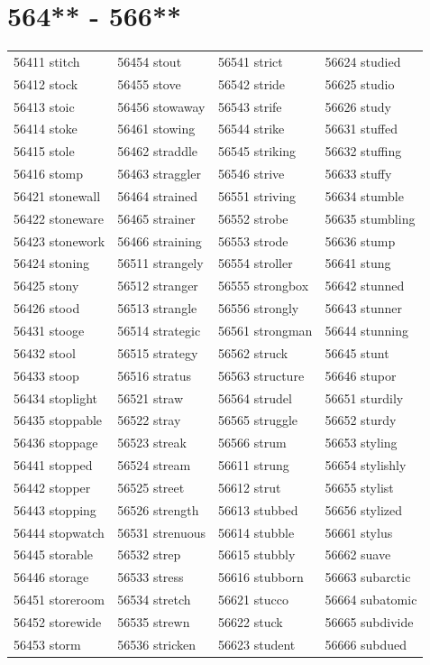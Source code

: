 \documentclass[10pt, oneside]{book}
\begin{document}
\begin{table}
	\centering
	\section*{564** - 566**}
	\begin{tabular}{l l l l}
56411 stitch &56454 stout &56541 strict &56624 studied\\
56412 stock &56455 stove &56542 stride &56625 studio\\
56413 stoic &56456 stowaway &56543 strife &56626 study\\
56414 stoke &56461 stowing &56544 strike &56631 stuffed\\
56415 stole &56462 straddle &56545 striking &56632 stuffing\\
56416 stomp &56463 straggler &56546 strive &56633 stuffy\\
56421 stonewall &56464 strained &56551 striving &56634 stumble\\
56422 stoneware &56465 strainer &56552 strobe &56635 stumbling\\
56423 stonework &56466 straining &56553 strode &56636 stump\\
56424 stoning &56511 strangely &56554 stroller &56641 stung\\
56425 stony &56512 stranger &56555 strongbox &56642 stunned\\
56426 stood &56513 strangle &56556 strongly &56643 stunner\\
56431 stooge &56514 strategic &56561 strongman &56644 stunning\\
56432 stool &56515 strategy &56562 struck &56645 stunt\\
56433 stoop &56516 stratus &56563 structure &56646 stupor\\
56434 stoplight &56521 straw &56564 strudel &56651 sturdily\\
56435 stoppable &56522 stray &56565 struggle &56652 sturdy\\
56436 stoppage &56523 streak &56566 strum &56653 styling\\
56441 stopped &56524 stream &56611 strung &56654 stylishly\\
56442 stopper &56525 street &56612 strut &56655 stylist\\
56443 stopping &56526 strength &56613 stubbed &56656 stylized\\
56444 stopwatch &56531 strenuous &56614 stubble &56661 stylus\\
56445 storable &56532 strep &56615 stubbly &56662 suave\\
56446 storage &56533 stress &56616 stubborn &56663 subarctic\\
56451 storeroom &56534 stretch &56621 stucco &56664 subatomic\\
56452 storewide &56535 strewn &56622 stuck &56665 subdivide\\
56453 storm &56536 stricken &56623 student &56666 subdued\\
	\end{tabular}
 \end{table}
\clearpage
\end{document}

